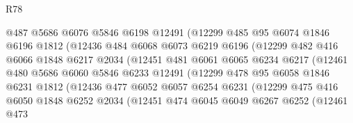 \begin{lexlean}{R78}
\begin{coremodule}
                        @487
                        @5686
                        @6076
                        @5846
                        @6198
                        @12491
                        (@12299
                          @485
                          @95
                          @6074
                          @1846
                          @6196
                          @1812
                          (@12436
                            @484
                            @6068
                            @6073
                            @6219
                            @6196
                            (@12299
                              @482
                              @416
                              @6066
                              @1848
                              @6217
                              @2034
                              (@12451
                                @481
                                @6061
                                @6065
                                @6234
                                @6217
                                (@12461
                                  @480
                                  @5686
                                  @6060
                                  @5846
                                  @6233
                                  @12491
                                  (@12299
                                    @478
                                    @95
                                    @6058
                                    @1846
                                    @6231
                                    @1812
                                    (@12436
                                      @477
                                      @6052
                                      @6057
                                      @6254
                                      @6231
                                      (@12299
                                        @475
                                        @416
                                        @6050
                                        @1848
                                        @6252
                                        @2034
                                        (@12451
                                          @474
                                          @6045
                                          @6049
                                          @6267
                                          @6252
                                          (@12461
                                            @473

\end{coremodule}
\end{lexlean}
